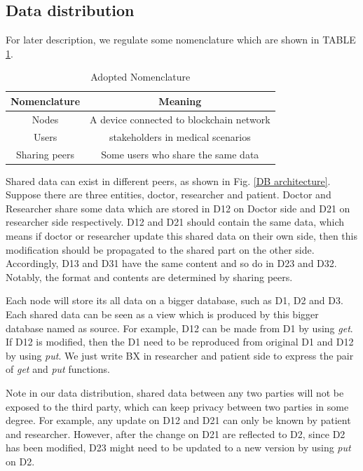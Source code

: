 \documentclass[conference]{IEEEtran}
\begin{document}
\subsection{Data distribution}

For later description, we regulate some nomenclature which are shown in TABLE \ref{nomenclature}.

\begin{table}[htbp]
	\caption{Adopted Nomenclature}
	\begin{center}
		\begin{tabular}{c|c}
	    \hline
	    Nomenclature & Meaning \\
	    \hline
		Nodes & A device connected to blockchain network  \\
		Users &   stakeholders in medical scenarios\\ 
	    Sharing peers &  Some users who share the same data  \\
		\hline
		\end{tabular}
		\label{nomenclature}
	\end{center}
\end{table}

Shared data can exist in different peers, as shown in Fig. \ref{DB architecture}. Suppose there are three entities, doctor, researcher and patient. Doctor and Researcher share some data which are stored in D12 on Doctor side and D21 on researcher side respectively. D12 and D21 should contain the same data, which means if doctor or researcher update this shared data on their own side, then this modification should be propagated to the shared part on the other side. Accordingly, D13 and D31 have the same content and so do in D23 and D32. Notably, the format and contents are determined by sharing peers.

Each node will store its all data on a bigger database, such as D1, D2 and D3. Each shared data can be seen as a view which is produced by this bigger database named as source. For example, D12 can be made from D1 by using \emph{get}. If D12 is modified, then the D1 need to be reproduced from original D1 and D12 by using \emph{put}. We just write BX in researcher and patient side to express the pair of \emph{get} and \emph{put} functions.

Note in our data distribution, shared data between any two parties will not be exposed to the third party, which can keep privacy between two parties in some degree. For example, any update on D12 and D21 can only be known by patient and researcher. However, after the change on D21 are reflected to D2, since D2 has been modified, D23 might need to be updated to a new version by using \emph{put} on D2.
\end{document}
